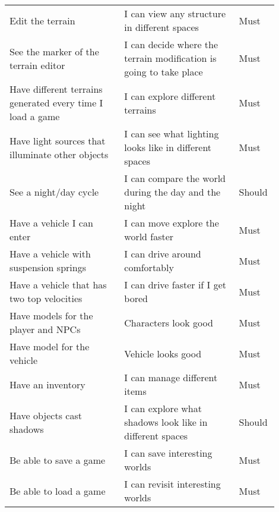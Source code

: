 \begin{table}[H]
\begin{tabular}{p{0.4\linewidth}|p{0.4\linewidth}|p{0.1\linewidth}}
        Edit the terrain                                           & I can view any structure in different spaces                       & Must           \\
        See the marker of the terrain editor                       & I can decide where the terrain modification is going to take place & Must           \\
        Have different terrains generated every time I load a game & I can explore different terrains                                   & Must           \\
        Have light sources that illuminate other objects           & I can see what lighting looks like in different spaces             & Must           \\
        See a night/day cycle                                      & I can compare the world during the day and the night               & Should         \\
        Have a vehicle I can enter                                 & I can move explore the world faster                                & Must           \\
        Have a vehicle with suspension springs                     & I can drive around comfortably                                     & Must           \\
        Have a vehicle that has two top velocities                 & I can drive faster if I get bored                                  & Must           \\
        Have models for the player and NPCs                        & Characters look good                                               & Must           \\
        Have model for the vehicle                                 & Vehicle looks good                                                 & Must           \\
        Have an inventory                                          & I can manage different items                                       & Must           \\
        Have objects cast shadows                                  & I can explore what shadows look like in different spaces           & Should         \\
        Be able to save a game                                     & I can save interesting worlds                                      & Must           \\
        Be able to load a game                                     & I can revisit interesting worlds                                   & Must           \\

\end{tabular}
\end{table}
